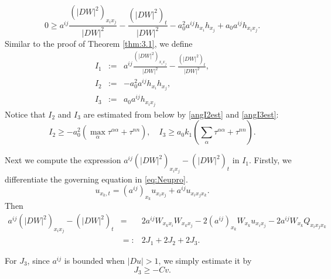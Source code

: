 \documentclass[12pt]{article}
\numberwithin{equation}{section}
\theoremstyle{plain}
\theoremstyle{definition}
\theoremstyle{remark}
\begin{document}
\begin{equation}  \label{eq:neuineq2}
    0 \geq a^{ij} \frac{\left(|DW|^2 \right)_{x_i x_j}}{|DW|^2} - \frac{\left(|DW|^2 \right)_t}{|DW|^2} - a_0^2 a^{ij} h_{x_i} h_{x_j} + a_0 a^{ij} h_{x_i x_j}.
\end{equation}
Similar to the proof of Theorem \ref{thm:3.1}, we define
\begin{eqnarray}
   I_1 &:= & a^{ij} \frac{\left(|DW|^2 \right)_{x_i x_j}}{|DW|^2} - \frac{\left(|DW|^2 \right)_t}{|DW|^2}, \\
    I_2 &:= & -a_0^2 a^{ij} h_{x_i} h_{x_j}, \\
    I_3 &:= & a_0 a^{ij} h_{x_i x_j}     
\end{eqnarray}
Notice that $I_2$ and $I_3$ are estimated from below by \eqref{angI2est} and \eqref{angI3est}:
\begin{equation} \label{eq:neuIest}
    I_2 \geq - a_0^2 \left(\max_{\alpha} \tau^{\alpha \alpha} + \tau^{n n} \right),
\quad
    I_3 \geq a_0 k_1 \left(\sum_{\alpha} \tau^{\alpha \alpha} + \tau^{n n} \right).    
\end{equation}

Next we compute the expression $a^{ij} \left(|DW|^2 \right)_{x_i x_j} - \left(|DW|^2 \right)_t$ in $I_1$. 
Firstly, we differentiate the governing equation in \eqref{eq:Neupro}.
\begin{equation*}
    u_{x_k,t} = (a^{ij})_{x_k} u_{x_i x_j} + a^{ij} u_{x_i x_j x_k}.
\end{equation*}
Then 
\begin{eqnarray}
    a^{ij} \left(|DW|^2 \right)_{x_i x_j} - \left(|DW|^2 \right)_t 
    & =& 2 a^{ij} W_{x_k x_i} W_{x_k x_j} - 2 (a^{ij})_{x_k} W_{x_k} u_{x_i x_j} - 2 a^{ij} W_{x_k} Q_{x_i x_j x_k}
    \nonumber\\
    & =: & 2 J_1 + 2 J_2 + 2 J_3. \label{eq:neu_Ji}
\end{eqnarray}

For $J_3$, since $a^{ij}$ is bounded when $|Du| >1$, we simply estimate it by
\begin{equation}  \label{eq:neuJ3}
    J_3 \geq -C v.
\end{equation}
\end{document}
